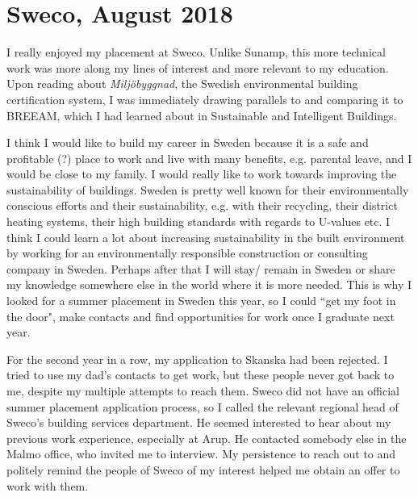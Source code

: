 \newpage
\section{Sweco, August 2018}


I really enjoyed my placement at Sweco.
Unlike Sunamp, this more technical work was more along my lines of interest and more relevant to my education.
Upon reading about \textit{Miljöbyggnad}, the Swedish environmental building certification system, I was immediately drawing parallels to and comparing it to BREEAM, which I had learned about in Sustainable and Intelligent Buildings.

I think I would like to build my career in Sweden because it is a safe and profitable (?) place to work and live with many benefits, e.g. parental leave, and I would be close to my family.
I would really like to work towards improving the sustainability of buildings.
Sweden is pretty well known for their environmentally conscious efforts and their sustainability, e.g. with their recycling, their district heating systems, their high building standards with regards to U-values etc.
I think I could learn a lot about increasing sustainability in the built environment by working for an environmentally responsible construction or consulting company in Sweden.
Perhaps after that I will stay/ remain in Sweden or share my knowledge somewhere else in the world where it is more needed.
This is why I looked for a summer placement in Sweden this year, so I could ``get my foot in the door", make contacts and find opportunities for work once I graduate next year.

For the second year in a row, my application to Skanska had been rejected.
I tried to use my dad's contacts to get work, but these people never got back to me, despite my multiple attempts to reach them.
Sweco did not have an official summer placement application process, so I called the relevant regional head of Sweco's building services department.
He seemed interested to hear about my previous work experience, especially at Arup.
He contacted somebody else in the Malmo office, who invited me to interview.
My persistence to reach out to and politely remind the people of Sweco of my interest helped me obtain an offer to work with them.

